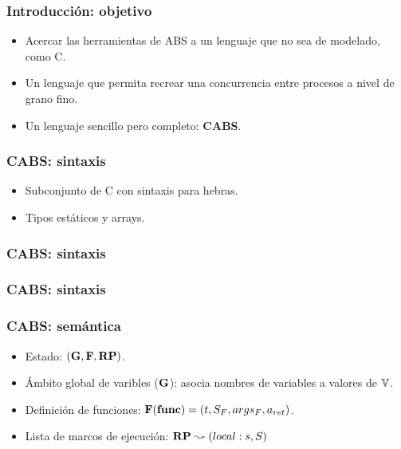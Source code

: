 \documentclass[spanish, a4paper, 12pt, final, slideColor, nototal, colorBG, pdf, noaccumulate, darkblue] {beamer}
\begin{document}
\begin{frame}
  \frametitle{Introducción: objetivo}
  \begin{itemize}
  \item Acercar las herramientas de ABS a un lenguaje que no sea de modelado, como C.
  \item Un lenguaje que permita recrear una concurrencia entre procesos a nivel de grano fino.
  \item Un lenguaje sencillo pero completo: \textbf{CABS}.
  \end{itemize}
\end{frame}

\begin{frame}[fragile]
  \frametitle{CABS: sintaxis}
  \begin{itemize}
  \item Subconjunto de C con sintaxis para hebras.
  \item Tipos estáticos y arrays.
  \end{itemize}
  
\end{frame}

\begin{frame}[fragile]
  \frametitle{CABS: sintaxis}
  \begin{multicols}{2}
    
  \end{multicols}
\end{frame}

\begin{frame}[fragile]
  \frametitle{CABS: sintaxis}
  
\end{frame}

\begin{frame}
  \frametitle{CABS: semántica}
  \begin{itemize}
  \item Estado: $(\mathbf{G}, \mathbf{F}, \textbf{RP})$.
  \item Ámbito global de varibles ($\mathbf{G}$): asocia nombres de variables a valores de $\mathbb{V}$.
  \item Definición de funciones: $\mathbf{F}(\textbf{func}) = (t, S_F, args_F, a_{ret})$.
  \item Lista de marcos de ejecución: $\textbf{RP} \leadsto (local:s, S)$
  \end{itemize}
\end{frame}
\end{document}
